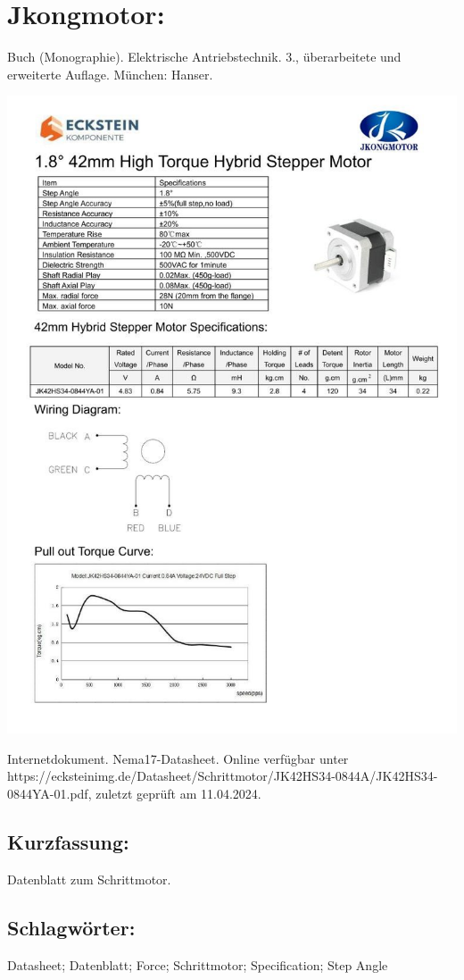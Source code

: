 \section*{Jkongmotor:}
Buch (Monographie). Elektrische Antriebstechnik.
3., überarbeitete und erweiterte Auflage. München: Hanser. \\
\begin{minipage}{0.5\textwidth}
	\includegraphics[width=\linewidth]{../Appendix/Literaturverzeichnis/img/Jkong.jpg}
\end{minipage}
\hfill
\begin{minipage}{0.48\textwidth}
Internetdokument. Nema17-Datasheet. Online verfügbar unter https://ecksteinimg.de/Datasheet/Schrittmotor/JK42HS34-0844A/JK42HS34-0844YA-01.pdf, zuletzt geprüft am 11.04.2024.
\subsection*{Kurzfassung:}
Datenblatt zum Schrittmotor.
\subsection*{Schlagwörter:}
Datasheet; Datenblatt; Force; Schrittmotor; Specification; Step Angle
\end{minipage}
